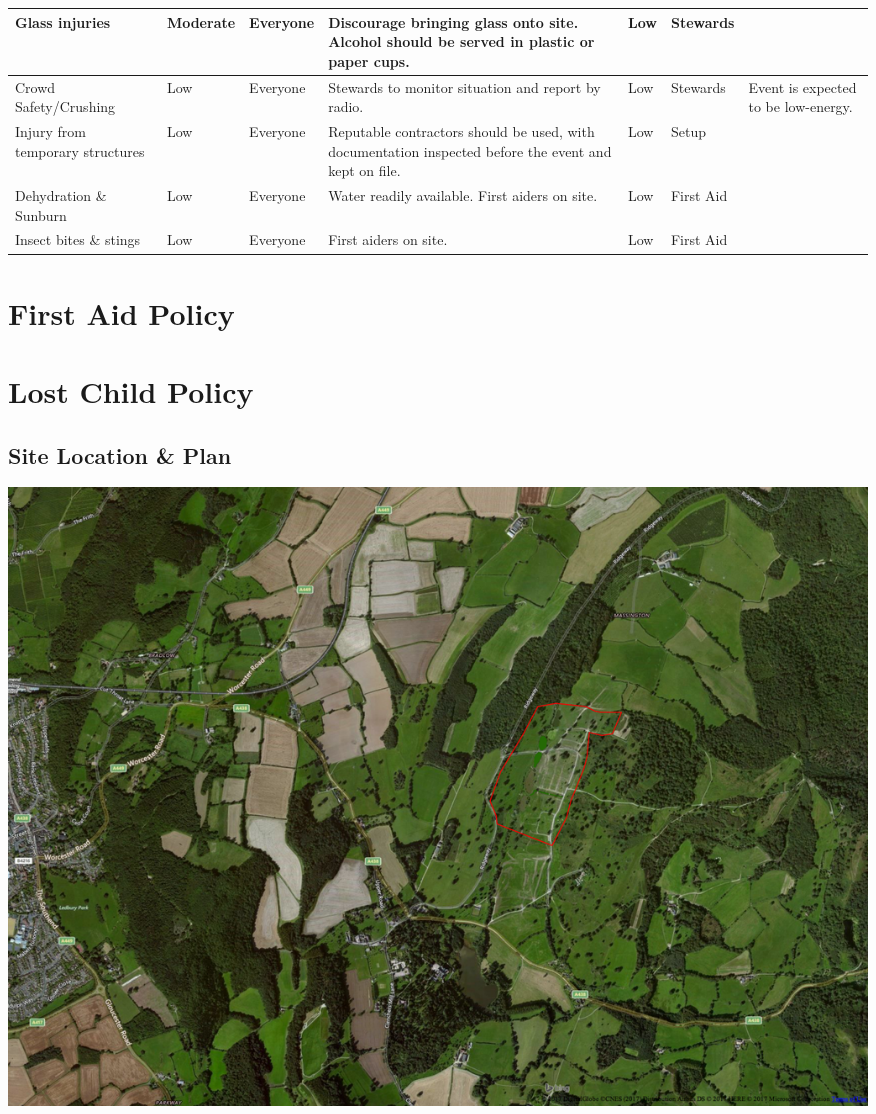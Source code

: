 \begin{landscape}
\begin{tabular}{| p{3cm} | l | p{1.5cm} | p{9cm} | p{1.5cm} | p{2cm} | p{6cm} |}
Glass injuries & Moderate & Everyone &
Discourage bringing glass onto site. Alcohol should be served in plastic or paper cups. &
Low & Stewards & \\ \hline

Crowd Safety/Crushing & Low & Everyone &
Stewards to monitor situation and report by radio. &
Low & Stewards & Event is expected to be low-energy. \\ \hline

Injury from temporary structures & Low & Everyone &
Reputable contractors should be used, with documentation inspected before the event and kept on file. &
Low & Setup & \\ \hline

Dehydration \& Sunburn & Low & Everyone &
Water readily available. First aiders on site. & Low & First Aid & \\ \hline

Insect bites \& stings & Low & Everyone &
First aiders on site. & Low & First Aid & \\ \hline

\end{tabular}

\end{landscape}
\restoregeometry

\appendix

\section{First Aid Policy}
\label{first-aid-policy}

\newpage

\section{Lost Child Policy}
\label{lost-child-policy}


\pagestyle{empty}
\begin{landscape}
\section{Site Location \& Plan}
\label{site-plan}
\includegraphics[width=24cm]{./supplementary/wide-map.png}
\end{landscape}


